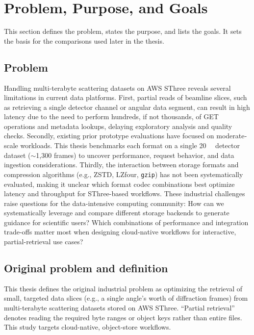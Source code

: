 \documentclass[nomenclature, english, bibtex]{kththesis}
\numberwithin{listing}{chapter}
\begin{document}
\section{Problem, Purpose, and Goals}
This section defines the problem, states the purpose, and lists the goals. It sets the basis for the comparisons used later in the thesis.

\subsection{Problem}
\label{sec:problem}
Handling multi-terabyte scattering datasets on \gls{AWS} \gls{SThree} reveals several limitations in current data platforms. First, partial reads of beamline slices, such as retrieving a single detector channel or angular data segment, can result in high latency due to the need to perform hundreds, if not thousands, of GET operations and metadata lookups, delaying exploratory analysis and quality checks. Secondly, existing prior prototype evaluations have focused on moderate‐scale workloads. This thesis benchmarks each format on a single \SI{20}{\gibi\byte} detector dataset (\(\sim\)1{,}300 frames) to uncover performance, request behavior, and data ingestion considerations. Thirdly, the interaction between storage formats and compression algorithms (e.g., \gls{ZSTD}, \gls{LZfour}, \texttt{gzip}) has not been systematically evaluated, making it unclear which format codec combinations best optimize latency and throughput for \gls{SThree}-based workflows. These industrial challenges raise questions for the data-intensive computing community: How can we systematically leverage and compare different storage backends to generate guidance for scientific users? Which combinations of performance and integration trade-offs matter most when designing cloud-native workflows for interactive, partial-retrieval use cases?

\subsection{Original problem and definition}
This thesis defines the original industrial problem as optimizing the retrieval of small, targeted data slices (e.g., a single angle’s worth of diffraction frames) from multi-terabyte scattering datasets stored on \gls{AWS} \gls{SThree}. “Partial retrieval” denotes reading the required byte ranges or object keys rather than entire files. This study targets cloud-native, object-store workflows.
\end{document}
